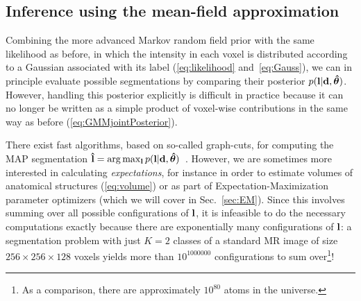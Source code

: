 \documentclass[10pt,twoside]{book}
\begin{document}
\subsection{Inference using the mean-field approximation}
\label{sec:meanfield}

Combining the more advanced Markov random field prior with the same likelihood as before, in which the intensity in each voxel is distributed according to a Gaussian associated with its label (\eqref{eq:likelihood} and~\eqref{eq:Gauss}), we can in principle evaluate possible segmentations by comparing their posterior $p( \mathbf{l} | \mathbf{d}, {\mbox{\boldmath {${\hat{\theta}}$}}} )$. However, handling this posterior explicitly is difficult in practice because it can no longer be written as a simple product of voxel-wise contributions in the same way as before (\eqref{eq:GMMjointPosterior}).%

There exist fast algorithms, based on so-called graph-cuts, for computing the MAP segmentation $\mathbf{\hat{l}} = \arg\max_{\mathbf{l}} p( \mathbf{l} | \mathbf{d}, {\mbox{\boldmath {${\hat{\theta}}$}}})$~\cite{graphCuts}. However, we are sometimes more interested in calculating \emph{expectations}, for instance in order to estimate volumes of anatomical structures (\eqref{eq:volume}) or as part of Expectation-Maximization parameter optimizers (which we will cover in Sec.~\ref{sec:EM}). Since this involves summing over all possible configurations of $\mathbf{l}$, it is infeasible to do the necessary computations exactly because there are exponentially many configurations of $\mathbf{l}$: a segmentation problem with just $K=2$ classes of a standard MR image of size $256\times256\times128$ voxels yields 
%
more than 
$10^{1000000}$
configurations to sum over\footnote{As a comparison, there are approximately $10^{80}$ atoms in the universe.}!
\end{document}

